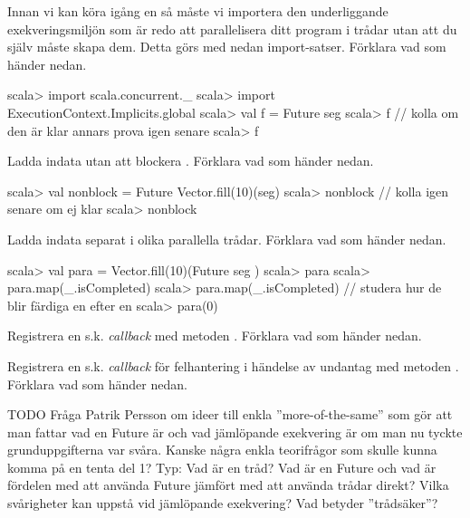 \Subtask Innan vi kan köra igång en  så måste vi importera den underliggande exekveringsmiljön som är redo att parallelisera ditt program i trådar utan att du själv måste skapa dem. Detta görs med nedan import-satser. Förklara vad som händer nedan.
\begin{REPL}
scala> import scala.concurrent._ 
scala> import ExecutionContext.Implicits.global
scala> val f = Future{ seg }
scala> f   // kolla om den är klar annars prova igen senare
scala> f
\end{REPL}

\Subtask Ladda indata utan att blockera . Förklara vad som händer nedan.
\begin{REPL}
scala> val nonblock = Future{ Vector.fill(10)(seg) }
scala> nonblock   // kolla igen senare om ej klar
scala> nonblock  
\end{REPL}

\Subtask Ladda indata separat i olika parallella trådar. Förklara vad som händer nedan.
\begin{REPL}
scala> val para = Vector.fill(10)(Future{ seg })
scala> para
scala> para.map(_.isCompleted)   
scala> para.map(_.isCompleted) // studera hur de blir färdiga en efter en
scala> para(0)
\end{REPL}

\Subtask Registrera en s.k. \emph{callback} med metoden . Förklara vad som händer nedan.


\Subtask Registrera en s.k. \emph{callback} för felhantering i händelse av undantag med metoden . Förklara vad som händer nedan.


\ExtraTasks %
  
\Task TODO  Fråga Patrik Persson om ideer till enkla ''more-of-the-same'' som gör att man fattar vad en Future är och vad jämlöpande exekvering är om man nu tyckte grunduppgifterna var svåra. Kanske några enkla teorifrågor som skulle kunna komma på en tenta del 1? Typ: Vad är en tråd? Vad är en Future och vad är fördelen med att använda Future jämfört med att använda trådar direkt? Vilka svårigheter kan uppstå vid jämlöpande exekvering? Vad betyder ''trådsäker''? %

